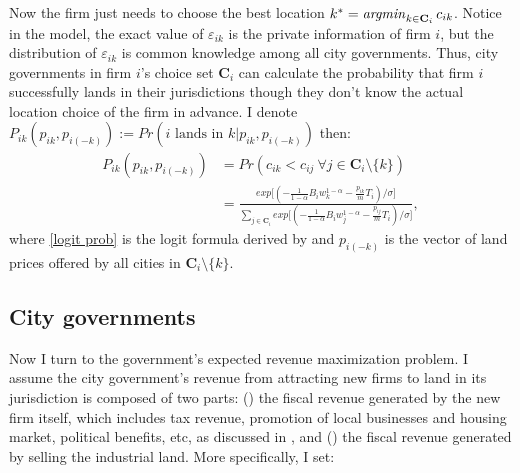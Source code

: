 Now the firm just needs to choose the best location
$k^{*} = \mathop{\it argmin}_{k \in \mathbf{C}_i} c_{ik}$.
Notice in the model, the exact value of $\varepsilon_{ik}$ is the private information of firm $i$,
but the distribution of $\varepsilon_{ik}$
is common knowledge among all city governments.
Thus, city governments in firm $i$'s choice set $\mathbf{C}_i$
can calculate the probability that firm $i$ successfully lands in their jurisdictions
though they don't know the actual location choice of the firm in advance.
I denote  $P_{ik}(p_{ik}, p_{i(-k)}) := Pr(i \text{ lands in }k|p_{ik}, p_{i(-k)})$ then:
\begin{align}
    P_{ik}(p_{ik}, p_{i(-k)}) & = Pr(c_{ik} < c_{ij} ~\forall j
    \in \mathbf{C}_i \setminus \{k\})  \nonumber                \\
                              & =
    \frac{exp\big[(-\frac{1}{1-\alpha} B_i w_k^{1-\alpha}
    - \frac{p_{ik}}{m}T_i)/\sigma\big]}
    {\sum_{j\in \mathbf{C}_i} exp\big[(-\frac{1}{1-\alpha} B_i w_j^{1-\alpha}
    - \frac{p_{ij}}{m} T_i)/\sigma\big]} \label{logit prob},
\end{align}
where \eqref{logit prob} is the logit formula derived by \cite{Mcfadden1974}
and $p_{i(-k)}$ is the vector of land prices offered by all cities in
$\mathbf{C}_i \setminus \{k\}$.
\ent

\subsection{City governments}
\label{City Governments}
Now I turn to the government's expected revenue maximization problem. I assume the
city government's revenue from attracting new firms to land in its jurisdiction is
composed of two parts: () the fiscal revenue generated by the new firm itself,
which includes tax revenue, promotion of local businesses and housing market,
political benefits, etc, as discussed in ,
and () the fiscal revenue generated by selling the industrial land.
More specifically, I set:

